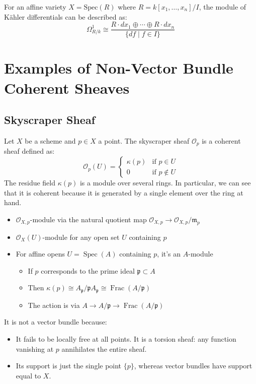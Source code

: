 \documentclass[12pt]{article}
\begin{document}
\begin{proposition}
For an affine variety $X = \text{Spec}(R)$ where $R = k[x_1, \ldots, x_n]/I$, the module of Kähler differentials can be described as:
\begin{equation}
\Omega^1_{R/k} \cong \frac{R \cdot dx_1 \oplus \cdots \oplus R \cdot dx_n}{\{df \mid f \in I\}}
\end{equation}
\end{proposition}



\section{Examples of Non-Vector Bundle Coherent Sheaves}
\subsection{Skyscraper Sheaf}
\begin{example}
    Let $X$ be a scheme and $p \in X$ a point. The skyscraper sheaf $\mathcal{O}_p$ is a coherent sheaf defined as:
    \[
        \mathcal{O}_p(U) = \begin{cases}
            \kappa(p) & \text{if } p \in U     \\
            0         & \text{if } p \not\in U
        \end{cases}
    \]
    The residue field $\kappa(p)$ is a module over several rings. In particular, we can see that it is coherent because it is generated by a single element over the ring at hand.
    \begin{itemize}
        \item $\mathcal{O}_{X,p}$-module via the natural quotient map $\mathcal{O}_{X,p} \to \mathcal{O}_{X,p}/\mathfrak{m}_p$
        \item $\mathcal{O}_X(U)$-module for any open set $U$ containing $p$
        \item For affine opens $U = \operatorname{Spec}(A)$ containing $p$, it's an $A$-module
              \begin{itemize}
                  \item If $p$ corresponds to the prime ideal $\mathfrak{p} \subset A$
                  \item Then $\kappa(p) \cong A_{\mathfrak{p}}/\mathfrak{p}A_{\mathfrak{p}} \cong \operatorname{Frac}(A/\mathfrak{p})$
                  \item The action is via $A \to A/\mathfrak{p} \to \operatorname{Frac}(A/\mathfrak{p})$
              \end{itemize}
    \end{itemize}

    It is not a vector bundle because:
    \begin{itemize}
        \item It fails to be locally free at all points. It is a torsion sheaf: any function vanishing at $p$ annihilates the entire sheaf.
        \item Its support is just the single point $\{p\}$, whereas vector bundles have support equal to $X$.
    \end{itemize}
\end{example}
\end{document}
